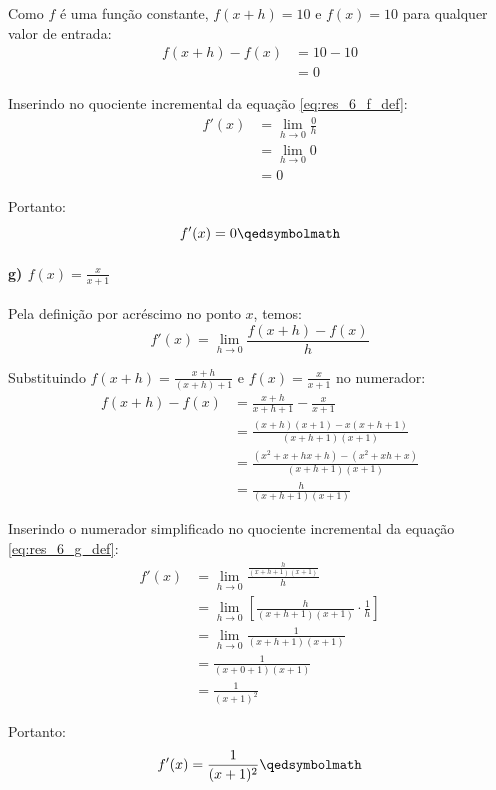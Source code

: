Como $f$ é uma função constante, $f(x + h) = 10$ e $f(x) = 10$ para qualquer valor de entrada:
\begin{align*}
f(x + h) - f(x) &= 10 - 10 \\
&= 0
\end{align*}

Inserindo no quociente incremental da equação \eqref{eq:res_6_f_def}:
\begin{align*}
f'(x) &= \lim_{h \to 0} \frac{0}{h} \\
      &= \lim_{h \to 0} 0 \\
      &= 0
\end{align*}

Portanto:
\[
  f'(x) = 0 \qedsymbolmath
\]

\setcounter{equation}{0}
\paragraph{g) $f(x) = \frac{x}{x + 1}$}

Pela definição por acréscimo no ponto $x$, temos:
\begin{equation}
f'(x) = \lim_{h \to 0} \frac{f(x + h) - f(x)}{h} \label{eq:res_6_g_def}
\end{equation}

Substituindo $f(x + h) = \frac{x + h}{(x + h) + 1}$ e $f(x) = \frac{x}{x + 1}$ no numerador:
\begin{align*}
f(x + h) - f(x) &= \frac{x + h}{x + h + 1} - \frac{x}{x + 1} \\
&= \frac{(x + h)(x + 1) - x(x + h + 1)}{(x + h + 1)(x + 1)} \\
&= \frac{(x^2 + x + hx + h) - (x^2 + xh + x)}{(x + h + 1)(x + 1)} \\
&= \frac{h}{(x + h + 1)(x + 1)}
\end{align*}

Inserindo o numerador simplificado no quociente incremental da equação \eqref{eq:res_6_g_def}:
\begin{align*}
f'(x) &= \lim_{h \to 0} \frac{\frac{h}{(x + h + 1)(x + 1)}}{h} \\
      &= \lim_{h \to 0} \left[ \frac{h}{(x + h + 1)(x + 1)} \cdot \frac{1}{h} \right] \\
      &= \lim_{h \to 0} \frac{1}{(x + h + 1)(x + 1)} \\
      &= \frac{1}{(x + 0 + 1)(x + 1)} \\
      &= \frac{1}{(x + 1)^2}
\end{align*}

Portanto:
\[
  f'(x) = \frac{1}{(x + 1)^2} \qedsymbolmath
\]


